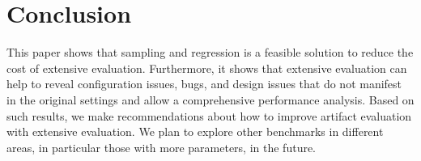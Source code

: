 \section{Conclusion}

This paper shows that sampling and regression is a feasible solution to reduce
the cost of extensive evaluation. Furthermore, it shows that extensive
evaluation can help to reveal configuration issues, bugs, and design
issues that do not manifest in the original settings and allow a comprehensive
performance analysis. Based on such results, we make recommendations
about how to improve artifact evaluation with extensive evaluation.
We plan to explore other benchmarks in different areas,
in particular those with more parameters, in the future.